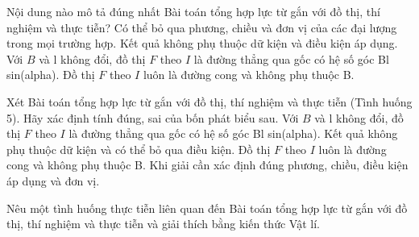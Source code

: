 \begin{ex}
Nội dung nào mô tả đúng nhất Bài toán tổng hợp lực từ gắn với đồ thị, thí nghiệm và thực tiễn?
\choice
{Có thể bỏ qua phương, chiều và đơn vị của các đại lượng trong mọi trường hợp.}
{Kết quả không phụ thuộc dữ kiện và điều kiện áp dụng.}
{\True Với $B$ và l không đổi, đồ thị $F$ theo $I$ là đường thẳng qua gốc có hệ số góc Bl sin(alpha).}
{Đồ thị $F$ theo $I$ luôn là đường cong và không phụ thuộc B.}
\end{ex}

\begin{ex}
Xét Bài toán tổng hợp lực từ gắn với đồ thị, thí nghiệm và thực tiễn (Tình huống 5). Hãy xác định tính đúng, sai của bốn phát biểu sau.
\choiceTF
{\True Với $B$ và l không đổi, đồ thị $F$ theo $I$ là đường thẳng qua gốc có hệ số góc Bl sin(alpha).}
{Kết quả không phụ thuộc dữ kiện và có thể bỏ qua điều kiện.}
{Đồ thị $F$ theo $I$ luôn là đường cong và không phụ thuộc B.}
{\True Khi giải cần xác định đúng phương, chiều, điều kiện áp dụng và đơn vị.}
\end{ex}

\begin{bt}
Nêu một tình huống thực tiễn liên quan đến Bài toán tổng hợp lực từ gắn với đồ thị, thí nghiệm và thực tiễn và giải thích bằng kiến thức Vật lí.
\end{bt}

